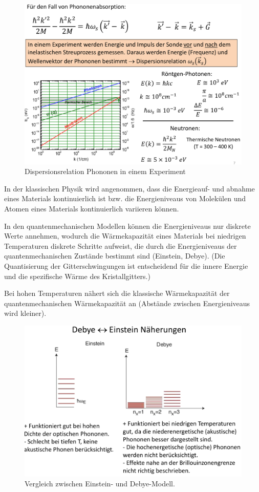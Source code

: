 \begin{figure}[H]  
    \centering
    \includegraphics[width=.8\textwidth]{resources/05-01-2015/Frage6_2.png}
    \caption{Dispersionsrelation Phononen in einem Experiment}
\end{figure}

\label{q:7}

In der klassischen Physik wird angenommen, dass die Energieauf- und abnahme eines Materials 
kontinuierlich ist bzw. die Energieniveaus von Molekülen und Atomen eines Materials kontinuierlich 
variieren können.

In den quantenmechanischen Modellen können die Energieniveaus nur diskrete Werte annehmen, wodurch die 
Wärmekapazität eines Materials bei niedrigen Temperaturen diskrete Schritte 
aufweist, die durch die Energieniveaus der quantenmechanischen Zustände bestimmt sind (Einstein, Debye).
(Die Quantisierung der Gitterschwingungen ist entscheidend für die innere Energie und
die spezifische Wärme des Kristallgitters.)

Bei hohen Temperaturen nähert sich die klassische Wärmekapazität der quantenmechanischen Wärmekapazität 
an (Abstände zwischen Energieniveaus wird kleiner).

\begin{figure}[H]  
    \centering
    \includegraphics[width=.8\textwidth]{resources/05-01-2015/Frage7.png}
    \caption{Vergleich zwischen Einstein- und Debye-Modell.}
\end{figure}

